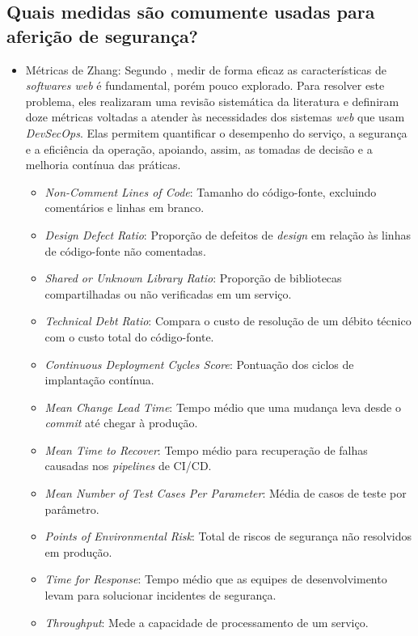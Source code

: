 \subsection{Quais medidas são comumente usadas para aferição de segurança?}
\begin{itemize}
    \item Métricas de Zhang: Segundo , medir de forma eficaz as características de \textit{softwares web} é fundamental, porém pouco explorado. Para resolver este problema, eles realizaram uma revisão sistemática da literatura e definiram doze métricas voltadas a atender às necessidades dos sistemas \textit{web} que usam \textit{DevSecOps}. Elas permitem quantificar o desempenho do serviço, a segurança e a eficiência da operação, apoiando, assim, as tomadas de decisão e a melhoria contínua das práticas.  
    \begin{itemize}
        \item \textit{Non-Comment Lines of Code}: Tamanho do código-fonte, excluindo comentários e linhas em branco.
        \item \textit{Design Defect Ratio}: Proporção de defeitos de \textit{design} em relação às linhas de código-fonte não comentadas.
        \item \textit{Shared or Unknown Library Ratio}: Proporção de bibliotecas compartilhadas ou não verificadas em um serviço.
        \item \textit{Technical Debt Ratio}: Compara o custo de resolução de um débito técnico com o custo total do código-fonte.
        \item \textit{Continuous Deployment Cycles Score}: Pontuação dos ciclos de implantação contínua.
        \item \textit{Mean Change Lead Time}: Tempo médio que uma mudança leva desde o \textit{commit} até chegar à produção.
        \item \textit{Mean Time to Recover}: Tempo médio para recuperação de falhas causadas nos \textit{pipelines} de CI/CD.
        \item \textit{Mean Number of Test Cases Per Parameter}: Média de casos de teste por parâmetro.
        \item \textit{Points of Environmental Risk}: Total de riscos de segurança não resolvidos em produção.
        \item \textit{Time for Response}: Tempo médio que as equipes de desenvolvimento levam para solucionar incidentes de segurança.
        \item \textit{Throughput}: Mede a capacidade de processamento de um serviço.

\end{itemize}
\end{itemize}
